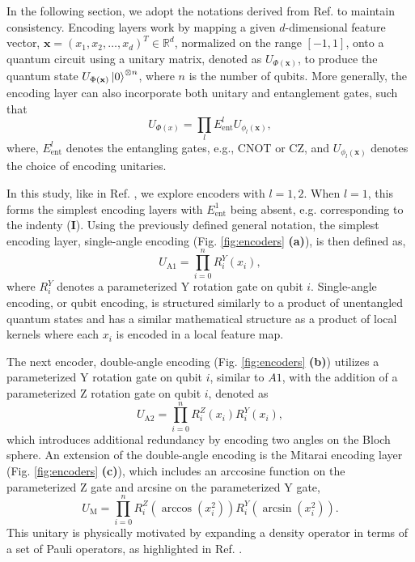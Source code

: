 \documentclass[journal=jacsat,manuscript=article]{achemso}
\begin{document}
In the following section, we adopt the notations derived from Ref. \citep{suzuki_predicting_2020} to maintain consistency.
Encoding layers work by mapping a given $d$-dimensional feature vector, $\mathbf{x}=(x_{1}, x_{2}, \ldots, x_{d})^{T} \in \mathbb{R}^{d}$, normalized on the range $[-1,1]$, onto a quantum circuit using a unitary matrix, denoted as $U_{\Phi(\mathbf{x})}$, to produce the quantum state $U_{\Phi(\mathbf{x})}\ket{0}^{\otimes n}$, where $n$ is the number of qubits.
More generally, the encoding layer can also incorporate both unitary and entanglement gates, such that 
\begin{equation}
	U_{\Phi(x)} =  \prod_{l} E_{\text{ent}}^{l} U_{\phi_{l}(\mathbf{x})},
	\label{eq:general_encoding}
\end{equation}
where, $E_{\text{ent}}^{l}$ denotes the entangling gates, e.g., CNOT or CZ, and  $U_{\phi_{l}(\mathbf{x})}$ denotes the choice of encoding unitaries. 

In this study, like in Ref. \citep{suzuki_predicting_2020}, we explore encoders with $l={1,2}$. 
When $l=1$, this forms the simplest encoding layers with $E_{\text{ent}}^{1}$ being absent, e.g. corresponding to the indenty ($\mathbf{I}$). 
Using the previously defined general notation, the simplest encoding layer, single-angle encoding (Fig. \ref{fig:encoders} \textbf{(a)}), is then defined as,
\begin{equation}
	U_{\text{A1}} = \prod_{i=0}^{n} R^{Y}_{i}(x_{i}),
	\label{eq:A1}
\end{equation}
where $R^{Y}_{i}$ denotes a parameterized Y rotation gate on qubit $i$.
Single-angle encoding, or qubit encoding, is structured similarly to a product of unentangled quantum states and has a similar mathematical structure as a product of local kernels where each $x_{i}$ is encoded in a local feature map.\cite{stoudenmire_supervised_2016,benedetti_parameterized_2019}

The next encoder, double-angle encoding (Fig. \ref{fig:encoders} \textbf{(b)}) utilizes a parameterized Y rotation gate on qubit $i$, similar to $A1$, with the addition of a parameterized Z rotation gate on qubit $i$, denoted as
\begin{equation}
	U_{\text{A2}} = \prod_{i=0}^{n}  R^{Z}_{i}(x_{i}) R^{Y}_{i}(x_{i}),
	\label{eq:A2}
\end{equation}
which introduces additional redundancy by encoding two angles on the Bloch sphere.
An extension of the double-angle encoding is the Mitarai encoding layer (Fig. \ref{fig:encoders} \textbf{(c)}), which includes an arccosine function on the parameterized Z gate and arcsine on the parameterized Y gate,
\begin{equation}
	U_{\text{M}}  = \prod_{i=0}^{n} R^{Z}_{i}(\arccos (x_{i}^{2})) R^{Y}_{i}(\arcsin (x_{i}^{2})).
	\label{eq:M}
\end{equation}
This unitary is physically motivated by expanding a density operator in terms of a set of Pauli operators, as highlighted in Ref. \cite{mitarai_quantum_2018}.
\end{document}
